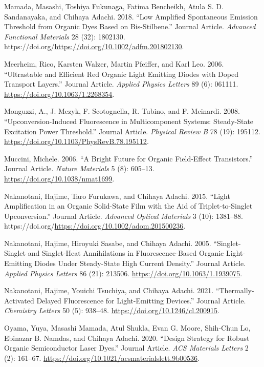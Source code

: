\documentclass[
  letterpaper,
  DIV=11,
  numbers=noendperiod,
  oneside]{scrreprt}
\newlength{\cslhangindent}
\newlength{\cslentryspacingunit} %
\newenvironment{CSLReferences}[2] %
 {%
  \setlength{\parindent}{0pt}
  \ifodd #1
  \let\oldpar\par
  \def\par{\hangindent=\cslhangindent\oldpar}
  \fi
  \setlength{\parskip}{#2\cslentryspacingunit}
 }%
 {}
\begin{document}
\begin{CSLReferences}{1}{0}
\leavevmode{}%
Mamada, Masashi, Toshiya Fukunaga, Fatima Bencheikh, Atula S. D.
Sandanayaka, and Chihaya Adachi. 2018. {``Low Amplified Spontaneous
Emission Threshold from Organic Dyes Based on Bis-Stilbene.''} Journal
Article. \emph{Advanced Functional Materials} 28 (32): 1802130.
https://doi.org/\url{https://doi.org/10.1002/adfm.201802130}.

\leavevmode{}%
Meerheim, Rico, Karsten Walzer, Martin Pfeiffer, and Karl Leo. 2006.
{``Ultrastable and Efficient Red Organic Light Emitting Diodes with
Doped Transport Layers.''} Journal Article. \emph{Applied Physics
Letters} 89 (6): 061111. \url{https://doi.org/10.1063/1.2268354}.

\leavevmode{}%
Monguzzi, A., J. Mezyk, F. Scotognella, R. Tubino, and F. Meinardi.
2008. {``Upconversion-Induced Fluorescence in Multicomponent Systems:
Steady-State Excitation Power Threshold.''} Journal Article.
\emph{Physical Review B} 78 (19): 195112.
\url{https://doi.org/10.1103/PhysRevB.78.195112}.

\leavevmode{}%
Muccini, Michele. 2006. {``A Bright Future for Organic Field-Effect
Transistors.''} Journal Article. \emph{Nature Materials} 5 (8): 605--13.
\url{https://doi.org/10.1038/nmat1699}.

\leavevmode{}%
Nakanotani, Hajime, Taro Furukawa, and Chihaya Adachi. 2015. {``Light
Amplification in an Organic Solid-State Film with the Aid of
Triplet-to-Singlet Upconversion.''} Journal Article. \emph{Advanced
Optical Materials} 3 (10): 1381--88.
https://doi.org/\url{https://doi.org/10.1002/adom.201500236}.

\leavevmode{}%
Nakanotani, Hajime, Hiroyuki Sasabe, and Chihaya Adachi. 2005.
{``Singlet-Singlet and Singlet-Heat Annihilations in Fluorescence-Based
Organic Light-Emitting Diodes Under Steady-State High Current
Density.''} Journal Article. \emph{Applied Physics Letters} 86 (21):
213506. \url{https://doi.org/10.1063/1.1939075}.

\leavevmode{}%
Nakanotani, Hajime, Youichi Tsuchiya, and Chihaya Adachi. 2021.
{``Thermally-Activated Delayed Fluorescence for Light-Emitting
Devices.''} Journal Article. \emph{Chemistry Letters} 50 (5): 938--48.
\url{https://doi.org/10.1246/cl.200915}.

\leavevmode{}%
Oyama, Yuya, Masashi Mamada, Atul Shukla, Evan G. Moore, Shih-Chun Lo,
Ebinazar B. Namdas, and Chihaya Adachi. 2020. {``Design Strategy for
Robust Organic Semiconductor Laser Dyes.''} Journal Article. \emph{ACS
Materials Letters} 2 (2): 161--67.
\url{https://doi.org/10.1021/acsmaterialslett.9b00536}.


\end{CSLReferences}
\end{document}
